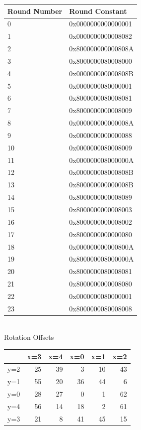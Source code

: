 \documentclass[11pt]{article}
\begin{document}
\begin{center}
\begin{tabular}{|l|l|}
    \hline
    Round Number & Round Constant \\
    \hline
    0 & 0x0000000000000001 \\ 
    \hline
    1 & 0x0000000000008082 \\
    \hline
    2 & 0x800000000000808A \\ 
    \hline
    3 & 0x8000000080008000 \\ 
    \hline
    4 & 0x000000000000808B \\ 
    \hline
    5 & 0x0000000080000001 \\ 
    \hline
    6 & 0x8000000080008081 \\ 
    \hline
    7 & 0x8000000000008009 \\ 
    \hline
    8 & 0x000000000000008A \\ 
    \hline
    9 & 0x0000000000000088 \\ 
    \hline
    10 & 0x0000000080008009 \\
    \hline
    11 & 0x000000008000000A \\ 
    \hline
    12 & 0x000000008000808B \\
    \hline
    13 & 0x800000000000008B \\
    \hline
    14 & 0x8000000000008089 \\
    \hline
    15 & 0x8000000000008003 \\
    \hline
    16 & 0x8000000000008002 \\
    \hline
    17 & 0x8000000000000080 \\
    \hline
    18 & 0x000000000000800A \\
    \hline
    19 & 0x800000008000000A \\
    \hline
    20 & 0x8000000080008081 \\
    \hline
    21 & 0x8000000000008080 \\
    \hline
    22 & 0x0000000080000001 \\
    \hline
    23 & 0x8000000080008008 \\
    \hline
\end{tabular}
\vspace{1em}\\
Rotation Offsets
\vspace{1em}\\
\begin{tabular}{|r|r|r|r|r|r|}
    \hline
        & x=3 & x=4 & x=0 & x=1 & x=2 \\
    \hline
    y=2 & 25 & 39 & 3 & 10 & 43 \\
    \hline
    y=1 & 55 & 20 & 36 & 44 & 6 \\
    \hline
    y=0 & 28 & 27 & 0 & 1 & 62 \\
    \hline
    y=4 & 56 & 14 & 18 & 2 & 61 \\
    \hline
    y=3 & 21 & 8 & 41 & 45 & 15 \\
    \hline
\end{tabular}
\end{center}
\end{document}

